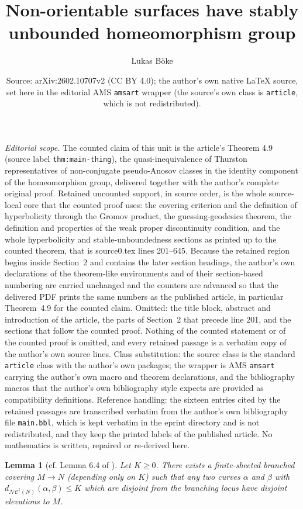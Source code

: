 \documentclass[10pt,a4paper]{amsart}
\title{Non-orientable surfaces have stably unbounded homeomorphism group}
\author{Lukas Böke}
\date{Source: arXiv:2602.10707v2 (CC BY 4.0); the author's own native \LaTeX{} source, set here in the editorial AMS \texttt{amsart} wrapper (the source's own class is \texttt{article}, which is not redistributed).}
\newtheorem{lemma}[theorem]{Lemma}
\newcommand{\fncg}{\mathcal{NC}^\dagger}
\begin{document}
\maketitle
\noindent\textit{Editorial scope.} The counted claim of this unit is the article's Theorem 4.9 (source label \texttt{thm:main-thing}), the quasi-inequivalence of Thurston representatives of non-conjugate pseudo-Anosov classes in the identity component of the homeomorphism group, delivered together with the author's complete original proof. Retained uncounted support, in source order, is the whole source-local core that the counted proof uses: the covering criterion and the definition of hyperbolicity through the Gromov product, the guessing-geodesics theorem, the definition and properties of the weak proper discontinuity condition, and the whole hyperbolicity and stable-unboundedness sections as printed up to the counted theorem, that is source0.tex lines 201--645. Because the retained region begins inside Section~2 and contains the later section headings, the author's own declarations of the theorem-like environments and of their section-based numbering are carried unchanged and the counters are advanced so that the delivered PDF prints the same numbers as the published article, in particular Theorem~4.9 for the counted claim. Omitted: the title block, abstract and introduction of the article, the parts of Section~2 that precede line 201, and the sections that follow the counted proof. Nothing of the counted statement or of the counted proof is omitted, and every retained passage is a verbatim copy of the author's own source lines. Class substitution: the source class is the standard \texttt{article} class with the author's own packages; the wrapper is AMS \texttt{amsart} carrying the author's own macro and theorem declarations, and the bibliography macros that the author's own bibliography style expects are provided as compatibility definitions. Reference handling: the sixteen entries cited by the retained passages are transcribed verbatim from the author's own bibliography file \texttt{main.bbl}, which is kept verbatim in the eprint directory and is not redistributed, and they keep the printed labels of the published article. No mathematics is written, repaired or re-derived here.

\setcounter{section}{2}
\setcounter{theorem}{2}
\begin{lemma}[cf. Lemma 6.4 of \cite{BHMMW}]\label{lem:covering-criterion}
    Let $K\geq 0$.
    There exists a finite-sheeted branched covering $M \rightarrow N$ (depending only on $K$) such that any two curves $\alpha$ and $\beta$ with $d_{\fncg(N)}(\alpha,\beta)\leq K$ which are disjoint from the branching locus have disjoint elevations to $M$.
\end{lemma}
\end{document}
